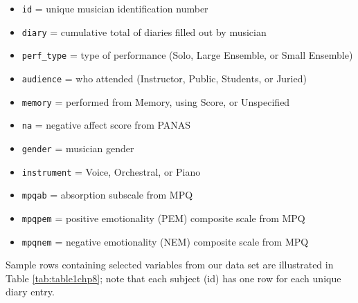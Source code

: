\documentclass[
]{krantz}
\providecommand{\tightlist}{%
  \setlength{\itemsep}{0pt}\setlength{\parskip}{0pt}}
\begin{document}
\begin{itemize}
\tightlist
\item
  \texttt{id} = unique musician identification number
\item
  \texttt{diary} = cumulative total of diaries filled out by musician
\item
  \texttt{perf\_type} = type of performance (Solo, Large Ensemble, or Small Ensemble)
\item
  \texttt{audience} = who attended (Instructor, Public, Students, or Juried)
\item
  \texttt{memory} = performed from Memory, using Score, or Unspecified
\item
  \texttt{na} = negative affect score from PANAS
\item
  \texttt{gender} = musician gender
\item
  \texttt{instrument} = Voice, Orchestral, or Piano
\item
  \texttt{mpqab} = absorption subscale from MPQ
\item
  \texttt{mpqpem} = positive emotionality (PEM) composite scale from MPQ
\item
  \texttt{mpqnem} = negative emotionality (NEM) composite scale from MPQ
\end{itemize}

Sample rows containing selected variables from our data set are illustrated in Table \ref{tab:table1chp8}; note that each subject (id) has one row for each unique diary entry.

\begin{table}

\caption{\label{tab:table1chp8}A snapshot of selected variables from the first three and the last three observations in the Music Performance Anxiety case study.}
\centering
{}
\end{table}
\end{document}
